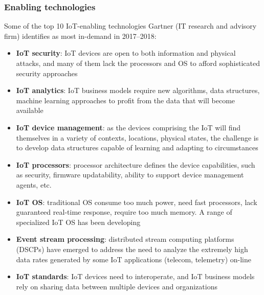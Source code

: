 \documentclass{beamer}
\begin{document}
\begin{frame}
	\frametitle{Enabling technologies}
	Some of the top 10 IoT-enabling technologies Gartner (IT research and advisory firm) identifies as most in-demand in 2017--2018:\\
	\begin{itemize}
		\item \textbf{IoT security}: IoT devices are open to both information and physical attacks, and many of them lack the processors and OS to afford sophisticated security approaches 
		\item \textbf{IoT analytics}: IoT business models require new algorithms, data structures, machine learning approaches to profit from the data that will become available
		\item \textbf{IoT device management}: as the devices comprising the IoT will find themselves in a variety of contexts, locations, physical states, the challenge is to develop data structures capable of learning and adapting to circumstances
	\end{itemize}
\end{frame}
\begin{frame}
	\begin{itemize}
		\item \textbf{IoT processors}: processor architecture defines the device capabilities, such as security, firmware updatability, ability to support device management agents, etc.
		\item \textbf{IoT OS}: traditional OS consume too much power, need fast processors, lack guaranteed real-time response, require too much memory. A range of specialized IoT OS has been developing
		\item \textbf{Event stream processing}: distributed stream computing platforms (DSCPs) have emerged to address the need to analyze the extremely high data rates generated by some IoT applications (telecom, telemetry) on-line 
		\item \textbf{IoT standards}: IoT devices need to interoperate, and IoT business models rely on sharing data between multiple devices and organizations
	\end{itemize}
\end{frame}
\end{document}

